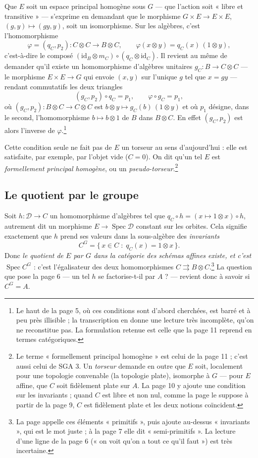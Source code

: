 \documentclass[11pt,a4paper]{article}
\begin{document}
Que $E$ soit un espace principal homogène sous $G$ --- que l'action soit
« libre et transitive » --- s'exprime en demandant que le morphisme
$G \times E \to E \times E$, $(g, y) \mapsto (g y, y)$, soit un isomorphisme.
Sur les algèbres, c'est l'homomorphisme
\[
\varphi = (q_C, p_2) \colon C \otimes C \longrightarrow B \otimes C,
\qquad
\varphi(x \otimes y) = q_C(x)\,(1 \otimes y),
\]
c'est-à-dire le composé $(\mathrm{id}_B \otimes m_C) \circ (q_C \otimes
\mathrm{id}_C)$. Il revient au même de demander qu'il existe un
homomorphisme d'algèbres unitaires $g_C \colon B \to C \otimes C$ --- le
morphisme $E \times E \to G$ qui envoie $(x, y)$ sur l'unique $g$ tel que
$x = g y$ --- rendant commutatifs les deux triangles
\[
(g_C, p_2) \circ q_C = p_1, \qquad \varphi \circ g_C = p_1,
\]
où $(g_C, p_2) \colon B \otimes C \to C \otimes C$ est
$b \otimes y \mapsto g_C(b)\,(1 \otimes y)$ et où $p_1$ désigne, dans le
second, l'homomorphisme $b \mapsto b \otimes 1$ de $B$ dans
$B \otimes C$. En effet $(g_C, p_2)$ est alors l'inverse de
$\varphi$.\footnote{Le haut de la page 5, où ces conditions sont d'abord
cherchées, est barré et à peu près illisible ; la transcription en donne une
lecture très incomplète, qu'on ne reconstitue pas. La formulation retenue est
celle que la page 11 reprend en termes catégoriques.}

Cette condition seule ne fait pas de $E$ un torseur au sens d'aujourd'hui :
elle est satisfaite, par exemple, par l'objet vide ($C = 0$). On dit qu'un
tel $E$ est \emph{formellement principal homogène}, ou un
\emph{pseudo-torseur}.\footnote{Le terme « formellement principal homogène »
est celui de la page 11 ; c'est aussi celui de SGA 3. Un \emph{torseur}
demande en outre que $E$ soit, localement pour une topologie convenable (la
topologie plate), isomorphe à $G$ --- pour $E$ affine, que $C$ soit
fidèlement plate sur $A$. La page 10 y ajoute une condition sur les
invariants ; quand $C$ est libre et non nul, comme la page le suppose à
partir de la page 9, $C$ est fidèlement plate et les deux notions
coïncident.}

\subsection*{Le quotient par le groupe}

Soit $h \colon \mathcal{D} \to C$ un homomorphisme d'algèbres tel que
$q_C \circ h = (x \mapsto 1 \otimes x) \circ h$, autrement dit un morphisme
$E \to \operatorname{Spec}\mathcal{D}$ constant sur les orbites. Cela
signifie exactement que $h$ prend ses valeurs dans la sous-algèbre des
\emph{invariants}
\[
C^G = \{\, x \in C \;:\; q_C(x) = 1 \otimes x \,\}.
\]
Donc \emph{le quotient de $E$ par $G$ dans la catégorie des schémas affines
existe, et c'est $\operatorname{Spec} C^G$} : c'est l'égalisateur des deux
homomorphismes $C \rightrightarrows B \otimes C$.\footnote{La page appelle
ces éléments « primitifs », puis ajoute au-dessus « invariants », qui est le
mot juste ; à la page 7 elle dit « semi-primitifs ». La lecture d'une ligne de
la page 6 (« on voit qu'on a tout ce qu'il faut ») est très incertaine.} La
question que pose la page 6 --- un tel $h$ se factorise-t-il par
$A$ ? --- revient donc à savoir si $C^G = A$.
\end{document}

